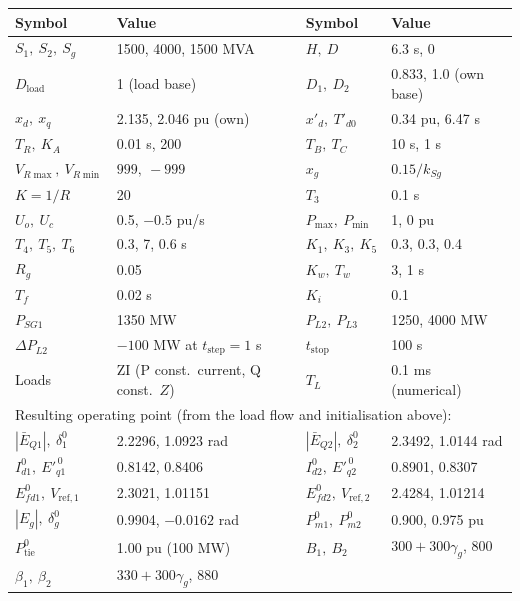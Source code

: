 \documentclass[11pt,a4paper]{article}
\numberwithin{equation}{section}
\begin{document}
\begin{center}
\small
\begin{tabular}{llll}
\toprule
Symbol & Value & Symbol & Value\\
\midrule
$S_1,\ S_2,\ S_g$ & 1500, 4000, 1500 MVA & $H,\ D$ & 6.3 s, 0\\
$D_{\text{load}}$ & 1 (load base) & $D_1,\ D_2$ & 0.833, 1.0 (own base)\\
$x_d,\ x_q$ & 2.135, 2.046 pu (own) & $x'_d,\ T'_{d0}$ & 0.34 pu, 6.47 s\\
$T_R,\ K_A$ & 0.01 s, 200 & $T_B,\ T_C$ & 10 s, 1 s\\
$V_{R\max},\ V_{R\min}$ & $999,\ -999$ & $x_g$ & $0.15/k_{Sg}$\\
$K=1/R$ & 20 & $T_3$ & 0.1 s\\
$U_o,\ U_c$ & 0.5, $-0.5$ pu/s & $P_{\max},\ P_{\min}$ & 1, 0 pu\\
$T_4,\ T_5,\ T_6$ & 0.3, 7, 0.6 s & $K_1,\ K_3,\ K_5$ & 0.3, 0.3, 0.4\\
$R_g$ & 0.05 & $K_w,\ T_w$ & 3, 1 s\\
$T_f$ & 0.02 s & $K_i$ & 0.1\\
$P_{SG1}$ & 1350 MW & $P_{L2},\ P_{L3}$ & 1250, 4000 MW\\
$\Delta P_{L2}$ & $-100$ MW at $t_{\text{step}}=1$ s & $t_{\text{stop}}$ & 100 s\\
Loads & ZI (P const.\ current, Q const.\ $Z$) & $T_L$ & 0.1 ms (numerical)\\
\midrule
\multicolumn{4}{l}{Resulting operating point (from the load flow and initialisation above):}\\
$|\bar E_{Q1}|,\ \delta_1^0$ & 2.2296, 1.0923 rad & $|\bar E_{Q2}|,\ \delta_2^0$ & 2.3492, 1.0144 rad\\
$I_{d1}^0,\ E'^{\,0}_{q1}$ & 0.8142, 0.8406 & $I_{d2}^0,\ E'^{\,0}_{q2}$ & 0.8901, 0.8307\\
$E_{fd1}^0,\ V_{\text{ref},1}$ & 2.3021, 1.01151 & $E_{fd2}^0,\ V_{\text{ref},2}$ & 2.4284, 1.01214\\
$|E_g|,\ \delta_g^0$ & 0.9904, $-0.0162$ rad & $P_{m1}^0,\ P_{m2}^0$ & 0.900, 0.975 pu\\
$P_{\text{tie}}^0$ & 1.00 pu (100 MW) & $B_1,\ B_2$ & $300+300\gamma_g$, 800\\
$\beta_1,\ \beta_2$ & $330+300\gamma_g$, 880 & & \\
\bottomrule
\end{tabular}
\end{center}
\end{document}
